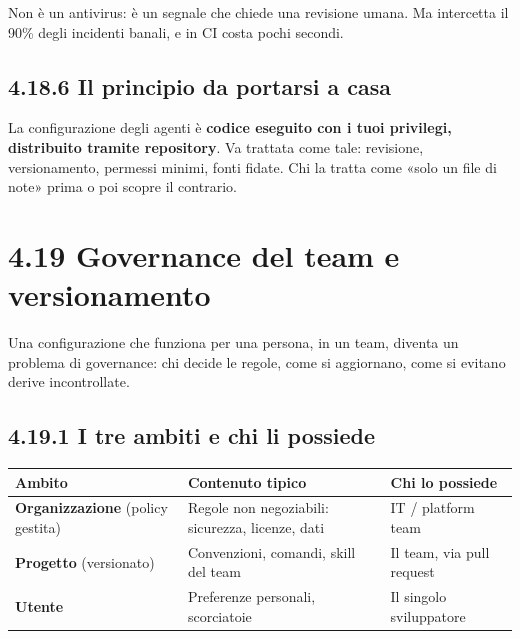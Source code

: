 \documentclass[
  italian,
  10pt,
]{book}
\newcounter{none} %
\begin{document}
Non è un antivirus: è un segnale che chiede una revisione umana. Ma
intercetta il 90\% degli incidenti banali, e in CI costa pochi secondi.

\subsection{4.18.6 Il principio da portarsi a
casa}\label{il-principio-da-portarsi-a-casa}

La configurazione degli agenti è \textbf{codice eseguito con i tuoi
privilegi, distribuito tramite repository}. Va trattata come tale:
revisione, versionamento, permessi minimi, fonti fidate. Chi la tratta
come «solo un file di note» prima o poi scopre il contrario.

\section{4.19 Governance del team e
versionamento}\label{governance-del-team-e-versionamento}

Una configurazione che funziona per una persona, in un team, diventa un
problema di governance: chi decide le regole, come si aggiornano, come
si evitano derive incontrollate.

\subsection{4.19.1 I tre ambiti e chi li
possiede}\label{i-tre-ambiti-e-chi-li-possiede}

{\def\LTcaptype{none} %
\begin{longtable}[]{@{}
  >{\raggedright\arraybackslash}p{}
  >{\raggedright\arraybackslash}p{}
  >{\raggedright\arraybackslash}p{}@{}}
\toprule\noalign{}
\begin{minipage}[b]{\linewidth}\raggedright
Ambito
\end{minipage} & \begin{minipage}[b]{\linewidth}\raggedright
Contenuto tipico
\end{minipage} & \begin{minipage}[b]{\linewidth}\raggedright
Chi lo possiede
\end{minipage} \\
\midrule\noalign{}
\endhead
\bottomrule\noalign{}
\endlastfoot
\textbf{Organizzazione} (policy gestita) & Regole non negoziabili:
sicurezza, licenze, dati & IT / platform team \\
\textbf{Progetto} (versionato) & Convenzioni, comandi, skill del team &
Il team, via pull request \\
\textbf{Utente} & Preferenze personali, scorciatoie & Il singolo
sviluppatore \\
\end{longtable}
}
\end{document}
